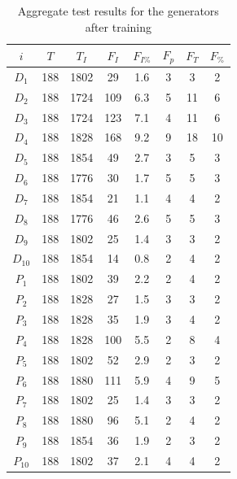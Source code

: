 \documentclass[12pt, titlepage]{report}
\theoremstyle{definition}
\begin{document}
\begin{table}
\begin{tabular}{cSSSSSSS} \toprule
    {$i$}     & {$T$} 	& {$T_I$}	& {$F_I$} 	& {$F_{I\%}$}		& {$F_p$} 	& {$F_T$} 	& {$F_{\%}$} \\ \midrule
    $D_1$  & 188   	& 1802		& 29    	 	& 1.6				    & 3  	 		& 3  	 		& 2 \\
    $D_2$  & 188   	& 1724 		& 109  		& 	6.3					& 5  	 		& 11	 		& 6 \\
    $D_3$  & 188  	& 1724 		& 123  		& 	7.1   				& 4  	 		& 11	 		& 6 \\
    $D_4$  & 188   	& 1828 		& 168  		& 9.2   				& 9      		& 18    		& 10 \\
    $D_5$  & 188   	& 1854 		& 49   			& 2.7					& 3  		    & 5		  		& 3 \\
    $D_6$  & 188  	& 1776 		& 30	  		& 1.7					& 5		  		& 5	 			& 3 \\
    $D_7$  & 188   	& 1854 		& 21	  		& 1.1					& 4		  		& 4		  		& 2 \\
    $D_8$  & 188   	& 1776 		& 46	  		& 2.6					& 5		 		& 5		  		& 3 \\
    $D_9$  & 188   	& 1802 		& 25	  		& 1.4					& 3		 		& 3	 			& 2\\
    $D_{10}$ & 188  	& 1854 		& 14	  		& 0.8					& 2		 		& 4		 		& 2 \\ \midrule
    $P_1$  & 188   	& 1802 		& 39		 	& 2.2					& 2 				& 4		 		& 2 \\
    $P_2$  & 188   	& 1828 		& 27	  		& 1.5					& 3		 		& 3		 		& 2 \\
    $P_3$  & 188   	& 1828 		& 35	  		& 1.9					& 3		 		& 4		 		& 2 \\
    $P_4$  & 188   	& 1828 		& 100  		& 5.5					& 2		 		& 8		  		& 4 \\
    $P_5$  & 188   	& 1802 		& 52	   		& 2.9					& 2		 		& 3		 		& 2 \\
    $P_6$  & 188   	& 1880 		& 111  		& 5.9					& 4		 		& 9		 		& 5 \\
    $P_7$  & 188   	& 1802 		& 25	  		& 1.4					& 3		 		& 3		 		& 2 \\
    $P_8$  & 188   	& 1880 		& 96	  		& 5.1					& 2		 		& 4		  		& 2 \\
    $P_9$  & 188   	& 1854 		& 36	  		& 1.9					& 2		 		& 3 				& 2 \\
    $P_{10}$ & 188  	& 1802 		& 37  			& 2.1					& 4		 		& 4		 		& 2 \\ \bottomrule
\end{tabular}

\caption{Aggregate test results for the generators after training}
\end{table}
\end{document}
